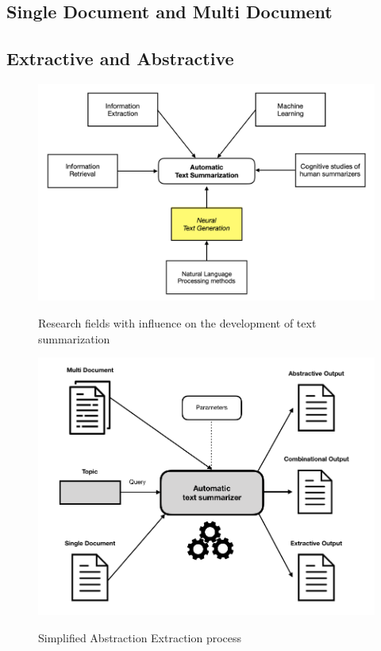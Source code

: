 \subsection{Single Document and Multi Document}\label{ss:multidoc}
\subsection{Extractive and Abstractive}


\begin{figure}
	\begin{center}
		\includegraphics[width=5.5in]{photos/summ}\\
		\caption{Research fields with influence on the development of text summarization}\label{summ}
	\end{center}
\end{figure}

\begin{figure}
	\begin{center}
		\includegraphics[width=5in]{photos/abex}\\
		\caption{Simplified Abstraction Extraction process}\label{abex}
	\end{center}
\end{figure}	

